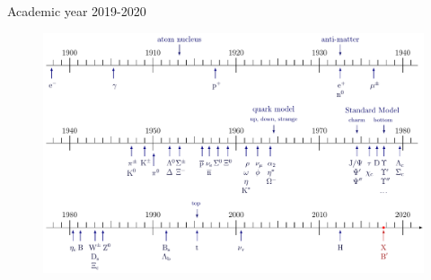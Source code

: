 \begin{titlepage}
	\vspace{0.5\baselineskip} %

	{\small Academic year 2019-2020}

	\vspace*{4\baselineskip}

	\begin{figure}[!h]
		\centering
		\includegraphics[width=1\textwidth]{../frontespizio/F_images/timeline.pdf}
	\end{figure}

	\vfill %

%
%
%
%

\end{titlepage}

\clearpage{\pagestyle{empty}\cleardoublepage}
